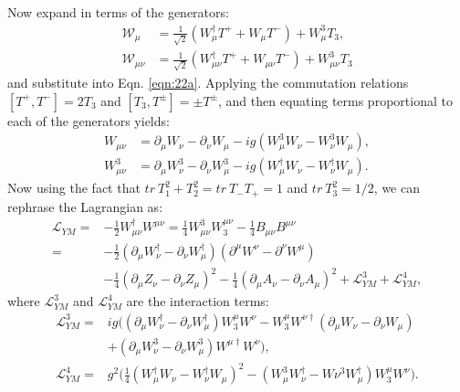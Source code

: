 \documentclass[a4paper,12pt]{article}
\begin{document}
Now expand in terms of the generators:
\begin{equation}
\begin{split}
\mathcal{W}_\mu &= \frac{1}{\sqrt{2}}(W_\mu^\dagger T^+ + W_\mu T^-) + W_\mu^3 T_3, \\
\mathcal{W}_{\mu \nu} &= \frac{1}{\sqrt{2}}(W_{\mu \nu}^\dagger T^+ + W_{\mu \nu} T^- ) + W_{\mu \nu} ^3 T_3
\end{split}
\end{equation}
and substitute into Eqn. \ref{eqn:22a}. Applying the commutation relations $[T^+, T^-] = 2 T_3$ and $[T_3, T^\pm] = \pm T^\pm$, and then equating terms proportional to each of the generators yields:
\begin{equation}
\begin{split}
W_{\mu \nu} &= \partial_\mu W_\nu - \partial_\nu W_\mu -ig(W_\mu^3 W_\nu - W_\nu^3 W_\mu), \\
W_{\mu \nu}^3 &= \partial_\mu W_\nu^3 - \partial_\nu W_\mu^3 - ig(W_\mu^\dagger W_\nu - W_\nu^\dagger W_\mu).
\end{split}
\end{equation}
Now using the fact that $tr \ T_1^2 + T_2^2 = tr\ T_-T_+ = 1$ and $tr \ T_3^2 = 1/2$, we can rephrase the Lagrangian as:
\begin{equation}
\begin{split}
\mathcal{L}_{YM} = &-\frac{1}{2} W_{\mu \nu}^\dagger W^{\mu \nu} = \frac{1}{4} W_{\mu \nu}^3 W^{\mu \nu}_3 - \frac{1}{4}B_{\mu \nu} B^{\mu \nu} \\
= &- \frac{1}{2}(\partial_\mu W_\nu^\dagger - \partial_\nu W_\mu^\dagger)(\partial^\mu W^\nu - \partial^\nu W^\mu)\\ &- \frac{1}{4}(\partial_\mu Z_\nu - \partial_\nu Z_\mu)^2 - \frac{1}{4}(\partial_\mu A_\nu - \partial_\nu A_\mu)^2 + \mathcal{L}_{YM}^3 + \mathcal{L}_{YM}^4,
\end{split}
\end{equation}
where $\mathcal{L}_{YM}^3$ and $\mathcal{L}_{YM}^4$ are the interaction terms:
\begin{equation}
\begin{split}
\mathcal{L}_{YM}^3 = &ig \bigg( (\partial_\mu W_\nu^\dagger - \partial_\nu W_\mu^\dagger) W_3^\mu W^\nu - W_3^\mu W^{\nu \dagger}(\partial_\mu W_\nu - \partial_\nu W_\mu) \\ &+ (\partial_\mu W_\nu^3 - \partial_\nu W_\mu^3) W^{\mu \dagger} W^\nu \bigg), \\
\mathcal{L}_{YM}^4 = &g^2 \bigg( \frac{1}{4}(W_\mu^\dagger W_\nu - W_\nu^\dagger W_\mu)^2 - (W_\mu^3 W_\nu^\dagger - W\nu^3 W_\mu^\dagger) W_3^\mu W^\nu \bigg).
\end{split}
\end{equation}
\end{document}
